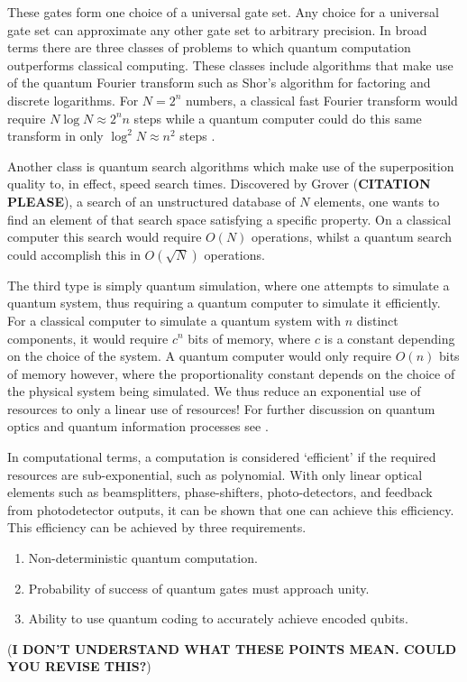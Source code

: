 \documentclass[aps,pra,twocolumn,amsmath,amssymb,nofootinbib,superscriptaddress]{revtex4}
\begin{document}
These gates form one choice of a universal gate set. Any choice for a universal gate set can approximate any other gate set to arbitrary precision. In broad terms there are three classes of problems to which quantum computation outperforms classical computing. These classes include algorithms that make use of the quantum Fourier transform such as Shor's algorithm for factoring and discrete logarithms. For $ N=2^n$ numbers, a classical fast Fourier transform would require $ N \log{N} \approx 2^n n$ steps while a quantum computer could do this same transform in only $\log^2{N} \approx n^2$ steps \cite{nielsen}.

Another class is quantum search algorithms which make use of the superposition quality to, in effect, speed search times. Discovered by Grover (\textbf{CITATION PLEASE}), a search of an unstructured database of $N$ elements, one wants to find an element of that search space satisfying a specific property. On a classical computer this search would require $O(N)$ operations, whilst a quantum search could accomplish this in $O(\sqrt{N})$ operations.

The third type is simply quantum simulation, where one attempts to simulate a quantum system, thus requiring a quantum computer to simulate it efficiently. For a classical computer to simulate a quantum system with $n$ distinct components, it would require $c^n$ bits of memory, where $c$ is a constant depending on the choice of the system. A quantum computer would only require $O(n)$ bits of memory however, where the proportionality constant depends on the choice of the physical system being simulated. We thus reduce an exponential use of resources to only a linear use of resources! For further discussion on quantum optics and quantum information processes see \cite{walls,aharonov,diVincenzo}.

In computational terms, a computation is considered `efficient' if the required resources are sub-exponential, such as polynomial. With only linear optical elements such as beamsplitters, phase-shifters, photo-detectors, and feedback from photodetector outputs, it can be shown that one can achieve this efficiency. This efficiency can be achieved by three requirements.
\begin{enumerate}
\item{Non-deterministic quantum computation.} 
\item{Probability of success of quantum gates must approach unity.}
\item{Ability to use quantum coding to accurately achieve encoded qubits.} 
\end{enumerate}
(\textbf{I DON'T UNDERSTAND WHAT THESE POINTS MEAN. COULD YOU REVISE THIS?})
\end{document}
